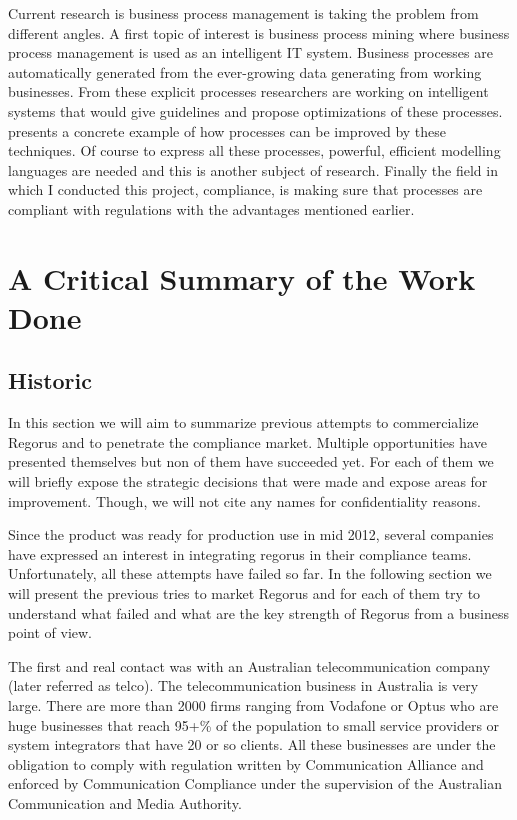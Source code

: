 \documentclass[10pt]{report}
\begin{document}
Current research is business process management is taking the problem from different angles. A first topic of interest is business process mining where business process management is used as an intelligent IT system. Business processes are automatically generated from the ever-growing data generating from working businesses. From these explicit processes researchers are working on intelligent systems that would give guidelines and propose optimizations of these processes. \autocite{keynoteBae} presents a concrete example of how processes can be improved by these techniques. Of course to express all these processes, powerful, efficient modelling languages are needed and this is another subject of research. Finally the field in which I conducted this project, compliance, is making sure that processes are compliant with regulations with the advantages mentioned earlier.


\section{A Critical Summary of the Work Done}

\subsection{Historic}
In this section we will aim to summarize previous attempts to commercialize Regorus and to penetrate the compliance market. Multiple opportunities have presented themselves but non of them have succeeded yet. For each of them we will briefly expose the strategic decisions that were made and expose areas for improvement. Though, we will not cite any names for confidentiality reasons.

Since the product was ready for production use in mid 2012, several companies have expressed an interest in integrating regorus in their compliance teams. Unfortunately, all these attempts have failed so far. In the following section we will present the previous tries to market Regorus and for each of them try to understand what failed and what are the key strength of Regorus from a business point of view.

The first and real contact was with an Australian telecommunication company (later referred as telco). The telecommunication business in Australia is very large. There are more than 2000 firms ranging from Vodafone or Optus who are huge businesses that reach 95+\% of the population to small service providers or system integrators that have 20 or so clients. All these businesses are under the obligation to comply with regulation written by Communication Alliance and enforced by Communication Compliance under the supervision of the Australian Communication and Media Authority.
\end{document}
